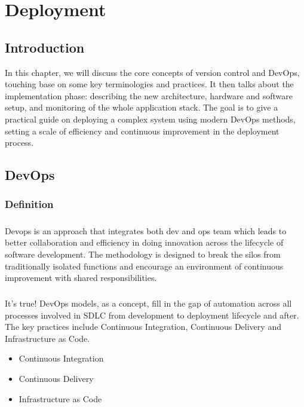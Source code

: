 \chapter{Deployment}


\setcounter{secnumdepth}{0} %
\section{Introduction}
In this chapter, we will discuss the core concepts of version control and DevOps, touching base on some key terminologies and practices. It then talks about the implementation phase: describing the new architecture, hardware and software setup, and monitoring of the whole application stack.
\newline
The goal is to give a practical guide on deploying a complex system using modern DevOps methods, setting a scale of efficiency and continuous improvement in the deployment process.

\setcounter{secnumdepth}{2} 
\section{DevOps}
\subsection{Definition}
\paragraph*{}
Devops is an approach that integrates both dev and ops team which leads to better collaboration and efficiency in doing innovation across the lifecycle of software development.
\newline
The methodology is designed to break the silos from traditionally isolated functions and encourage an environment of continuous improvement with shared responsibilities.
\paragraph*{}
It’s true! DevOps models, as a concept, fill in the gap of automation across all processes involved in SDLC from development to deployment lifecycle and after. The key practices include Continuous Integration, Continuous Delivery and Infrastructure as Code.

\begin{itemize}
  \item Continuous Integration
  \item Continuous Delivery
  \item Infrastructure as Code
\end{itemize}



